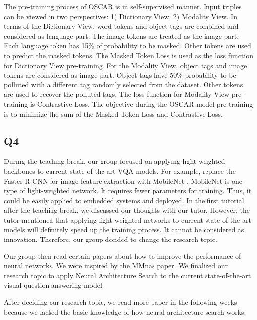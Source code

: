 \documentclass[12pt, a4paper]{article}
\begin{document}
\par\noindent \newline The pre-training process of OSCAR \cite{DBLP:journals/corr/abs-2004-06165} is in self-supervised manner. Input triples can be viewed in two perspectives: 1) Dictionary View, 2) Modality View. In terms of the Dictionary View, word tokens and object tags are combined and considered as language part. The image tokens are treated as the image part. Each language token has 15\% of probability to be masked. Other tokens are used to predict the masked tokens. The Masked Token Loss is used as the loss function for Dictionary View pre-training. For the Modality View, object tags and image tokens are considered as image part. Object tags have 50\% probability to be polluted with a different tag randomly selected from the dataset. Other tokens are used to recover the polluted tags. The loss function for Modality View pre-training is Contrastive Loss. The objective during the OSCAR model pre-training is to minimize the sum of the Masked Token Loss and Contrastive Loss.

\subsection*{Q4}
\par\noindent \newline During the teaching break, our group focused on applying light-weighted backbones to current state-of-the-art VQA models. For example, replace the Faster R-CNN \cite{DBLP:journals/corr/RenHG015} for image feature extraction with MobileNet \cite{DBLP:journals/corr/HowardZCKWWAA17}. MobileNet \cite{DBLP:journals/corr/HowardZCKWWAA17} is one type of light-weighted network. It requires fewer parameters for training. Thus, it could be easily applied to embedded systems and deployed. In the first tutorial after the teaching break, we discussed our thoughts with our tutor. However, the tutor mentioned that applying light-weighted networks to current state-of-the-art models will definitely speed up the training process. It cannot be considered as innovation. Therefore, our group decided to change the research topic.

\par\noindent \newline Our group then read certain papers about how to improve the performance of neural networks. We were inspired by the MMnas paper. We finalized our research topic to apply Neural Architecture Search to the current state-of-the-art visual-question answering model. 

\par\noindent \newline After deciding our research topic, we read more paper in the following weeks because we lacked the basic knowledge of how neural architecture search works. 


\newpage


\end{document}
